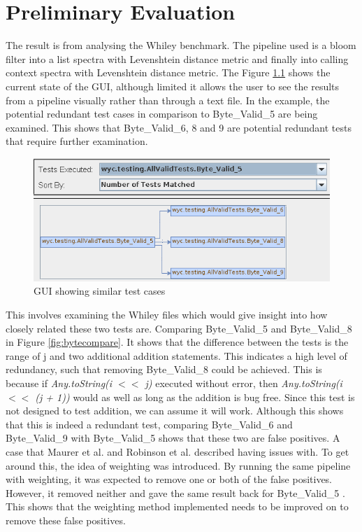 \chapter{Preliminary Evaluation}\label{C:evaluation}

The result is from analysing the Whiley benchmark. The pipeline used is a bloom filter into a list spectra with Levenshtein distance metric and finally into calling context spectra with Levenshtein distance metric. The Figure \ref{fig:similiartests} shows the current state of the GUI, although limited it allows the user to see the results from a pipeline visually rather than through a text file. In the example, the potential redundant test cases in comparison to Byte\_Valid\_5 are being examined. This shows that Byte\_Valid\_6, 8 and 9 are potential redundant tests that require further examination.

\begin{figure}[h]
\includegraphics[width=\textwidth]{model24.png}
\caption{GUI showing similar test cases}
\label{fig:similiartests}
\end{figure}

This involves examining the Whiley files which would give insight into how closely related these two tests are. Comparing Byte\_Valid\_5 and Byte\_Valid\_8 in Figure \ref{fig:bytecompare}. It shows that the difference between the tests is the range of j and two additional addition statements. This indicates a high level of redundancy, such that removing Byte\_Valid\_8 could be achieved. This is because if \textit{Any.toString(i $<<$ j)} executed without error, then \textit{Any.toString(i $<<$ (j + 1))} would as well as long as the addition is bug free. Since this test is not designed to test addition, we can assume it will work. Although this shows that this is indeed a redundant test, comparing Byte\_Valid\_6 and Byte\_Valid\_9 with Byte\_Valid\_5 shows that these two are false positives. A case that Maurer et al. \cite{koochakzadeh2009test} and Robinson et al. \cite{li2008static} described having issues with. To get around this, the idea of weighting was introduced. By running the same pipeline with weighting, it was expected to remove one or both of the false positives. However, it removed neither and gave the same result back for Byte\_Valid\_5 . This shows that the weighting method implemented needs to be improved on to remove these false positives.

